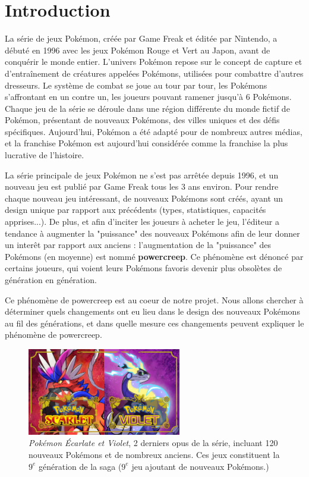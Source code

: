 \documentclass[a4paper,12pt]{article}
\begin{document}
\section{Introduction}
La série de jeux Pokémon, créée par Game Freak et éditée par Nintendo, a débuté
en 1996 avec les jeux Pokémon Rouge et Vert au Japon, avant de conquérir le
monde entier. L'univers Pokémon repose sur le concept de capture et
d'entraînement de créatures appelées Pokémons, utilisées pour combattre d'autres
dresseurs. Le système de combat se joue au tour par tour, les Pokémons
s'affrontant en un contre un, les joueurs pouvant ramener jusqu'à 6 Pokémons.
Chaque jeu de la série se déroule dans une région différente du monde fictif de
Pokémon, présentant de nouveaux Pokémons, des villes uniques et des défis
spécifiques. Aujourd'hui, Pokémon a été adapté pour de nombreux autres médias,
et la franchise Pokémon est aujourd'hui considérée comme la franchise la plus
lucrative de l'histoire.

La série principale de jeux Pokémon ne s'est pas arrêtée depuis 1996, et un
nouveau jeu est publié par Game Freak tous les 3 ans environ. Pour rendre chaque
nouveau jeu intéressant, de nouveaux Pokémons sont créés, ayant un design
unique par rapport aux précédents (types, statistiques, capacités apprises...).
De plus, et afin d'inciter les joueurs à acheter le jeu, l'éditeur a tendance à
augmenter la "puissance" des nouveaux Pokémons afin de leur donner un interêt
par rapport aux anciens : l'augmentation de la "puissance" des Pokémons (en
moyenne) est nommé \textbf{powercreep}. Ce phénomène est dénoncé par certains joueurs,
qui voient leurs Pokémons favoris devenir plus obsolètes de génération en
génération. 

Ce phénomène de powercreep est au coeur de notre projet. Nous allons chercher à
déterminer quels changements ont eu lieu dans le design des nouveaux Pokémons au
fil des générations, et dans quelle mesure ces changements peuvent expliquer le
phénomène de powercreep.

\begin{figure}[!h]
    \centering
    \includegraphics[width=0.6\textwidth]{Image/scarlet-violet.jpg}
    \caption{\textit{Pokémon Écarlate et Violet}, 2 derniers opus de la série,
    incluant 120 nouveaux Pokémons et de nombreux anciens. Ces jeux constituent
    la $9^{e}$ génération de la saga ($9^{e}$  jeu ajoutant de nouveaux
    Pokémons.)}
    \label{fig:image1}
\end{figure}
\end{document}
